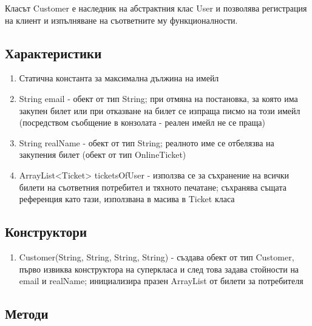 \documentclass[12pt]{article}
\begin{document}
    Класът Customer е наследник на абстрактния клас User и позволява регистрация на клиент и изпълняване на съответните му функционалности.

    \subsection{Характеристики}

        \begin{enumerate}
            \item Статична константа за максимална дължина на имейл
            \item String email - обект от тип String; при отмяна на постановка, за която има закупен билет или при отказване на билет се изпраща писмо на този имейл (посредством съобщение в конзолата - реален имейл не се праща)
            \item String realName - обект от тип String; реалното име се отбелязва на закупения билет (обект от тип OnlineTicket)
            \item ArrayList<Ticket> ticketsOfUser - използва се за съхранение на всички билети на съответния потребител и тяхното печатане; съхранява същата референция като тази, използвана в масива в Ticket класа
        \end{enumerate}

    \subsection{Конструктори}

        \begin{enumerate}
            \item Customer(String, String, String, String) - създава обект от тип Customer, първо извиква конструктора на суперкласа и след това задава стойности на email и realName; инициализира празен ArrayList от билети за потребителя
        \end{enumerate}

    \subsection{Методи}
\end{document}
